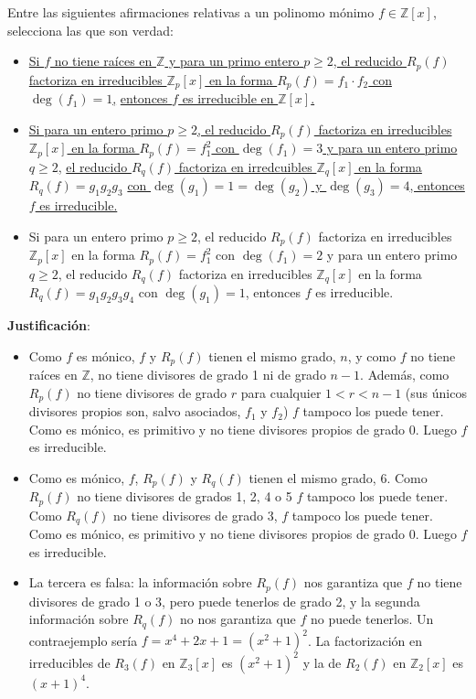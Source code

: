 \begin{ejercicio}
    Entre las siguientes afirmaciones relativas a un polinomo mónimo $f\in \mathbb{Z}[x]$, selecciona las que son verdad:
    \begin{itemize}
    \item \underline{Si $f$ no tiene raíces en $\mathbb{Z}$ y para un primo entero $p\geq 2$, el reducido $R_p(f)$}\newline
        \underline{factoriza en irreducibles $\mathbb{Z}_p[x]$ en la forma $R_p(f) = f_1 \cdot f_2$ con $\deg(f_1)=1$,}\newline
        \underline{entonces $f$ es irreducible en $\mathbb{Z}[x]$.}
\item \underline{Si para un entero primo $p\geq 2$, el reducido $R_p(f)$ factoriza en irreducibles}\newline
\underline{$\mathbb{Z}_p[x]$ en la forma $R_p(f) = f_1^2$ con $\deg(f_1)=3$ y para un entero primo $q\geq 2$,}\newline
\underline{el reducido $R_q(f)$ factoriza en irredcuibles $\mathbb{Z}_q[x]$ en la forma $R_q(f)=g_1g_2g_3$}\newline
\underline{con $\deg(g_1)=1=\deg(g_2)$ y $\deg(g_3)=4$, entonces $f$ es irreducible.}
        \item Si para un entero primo $p\geq 2$, el reducido $R_p(f)$ factoriza en irreducibles $\mathbb{Z}_p[x]$ en la forma $R_p(f)=f_1^2$ con $\deg(f_1)=2$ y para un entero primo $q\geq 2$, el reducido $R_q(f)$ factoriza en irreducibles $\mathbb{Z}_q[x]$ en la forma $R_q(f)=g_1g_2g_3g_4$ con $\deg(g_1)=1$, entonces $f$ es irreducible.
    \end{itemize}

    \noindent
    \textbf{Justificación}:
    \begin{itemize}
        \item Como $f$ es mónico, $f$ y $R_p(f)$ tienen el mismo grado, $n$, y como $f$ no tiene raíces en $\mathbb{Z}$, no tiene divisores de grado 1 ni de grado $n-1$. Además, como $R_p(f)$ no tiene divisores de grado $r$ para cualquier $1<r<n-1$ (sus únicos divisores propios son, salvo asociados, $f_1$ y $f_2$) $f$ tampoco los puede tener. Como es mónico, es primitivo y no tiene divisores propios de grado 0. Luego $f$ es irreducible.
        \item Como es mónico, $f$, $R_p(f)$ y $R_q(f)$ tienen el mismo grado, 6. Como $R_p(f)$ no tiene divisores de grados 1, 2, 4 o 5 $f$ tampoco los puede tener. Como $R_q(f)$ no tiene divisores de grado 3, $f$ tampoco los puede tener. Como es mónico, es primitivo y no tiene divisores propios de grado 0. Luego $f$ es irreducible.
        \item La tercera es falsa: la información sobre $R_p(f)$ nos garantiza que $f$ no tiene divisores de grado 1 o 3, pero puede tenerlos de grado 2, y la segunda información sobre $R_q(f)$ no nos garantiza que $f$ no puede tenerlos. Un contraejemplo sería $f=x^4+2x+1={(x^2+1)}^{2}$. La factorización en irreducibles de $R_3(f)$ en $\mathbb{Z}_3[x]$ es ${(x^2+1)}^{2}$ y la de $R_2(f)$ en $\mathbb{Z}_2[x]$ es ${(x+1)}^{4}$.
    \end{itemize}
\end{ejercicio}

\newpage
\resetearcontador
